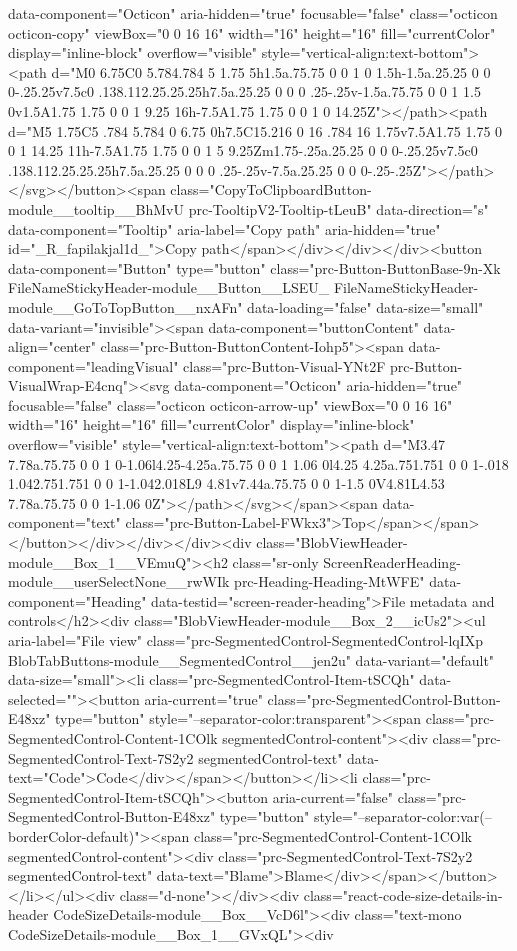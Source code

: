 {{{{{data-component="Octicon" aria-hidden="true" focusable="false" class="octicon octicon-copy" viewBox="0 0 16 16" width="16" height="16" fill="currentColor" display="inline-block" overflow="visible" style="vertical-align:text-bottom"><path d="M0 6.75C0 5.784.784 5 1.75 5h1.5a.75.75 0 0 1 0 1.5h-1.5a.25.25 0 0 0-.25.25v7.5c0 .138.112.25.25.25h7.5a.25.25 0 0 0 .25-.25v-1.5a.75.75 0 0 1 1.5 0v1.5A1.75 1.75 0 0 1 9.25 16h-7.5A1.75 1.75 0 0 1 0 14.25Z"></path><path d="M5 1.75C5 .784 5.784 0 6.75 0h7.5C15.216 0 16 .784 16 1.75v7.5A1.75 1.75 0 0 1 14.25 11h-7.5A1.75 1.75 0 0 1 5 9.25Zm1.75-.25a.25.25 0 0 0-.25.25v7.5c0 .138.112.25.25.25h7.5a.25.25 0 0 0 .25-.25v-7.5a.25.25 0 0 0-.25-.25Z"></path></svg></button><span class="CopyToClipboardButton-module__tooltip__BhMvU prc-TooltipV2-Tooltip-tLeuB" data-direction="s" data-component="Tooltip" aria-label="Copy path" aria-hidden="true" id="_R_fapilakjal1d_">Copy path</span></div></div></div><button data-component="Button" type="button" class="prc-Button-ButtonBase-9n-Xk FileNameStickyHeader-module__Button__LSEU_ FileNameStickyHeader-module__GoToTopButton__nxAFn" data-loading="false" data-size="small" data-variant="invisible"><span data-component="buttonContent" data-align="center" class="prc-Button-ButtonContent-Iohp5"><span data-component="leadingVisual" class="prc-Button-Visual-YNt2F prc-Button-VisualWrap-E4cnq"><svg data-component="Octicon" aria-hidden="true" focusable="false" class="octicon octicon-arrow-up" viewBox="0 0 16 16" width="16" height="16" fill="currentColor" display="inline-block" overflow="visible" style="vertical-align:text-bottom"><path d="M3.47 7.78a.75.75 0 0 1 0-1.06l4.25-4.25a.75.75 0 0 1 1.06 0l4.25 4.25a.751.751 0 0 1-.018 1.042.751.751 0 0 1-1.042.018L9 4.81v7.44a.75.75 0 0 1-1.5 0V4.81L4.53 7.78a.75.75 0 0 1-1.06 0Z"></path></svg></span><span data-component="text" class="prc-Button-Label-FWkx3">Top</span></span></button></div></div></div><div class="BlobViewHeader-module__Box_1__VEmuQ"><h2 class="sr-only ScreenReaderHeading-module__userSelectNone__rwWIk prc-Heading-Heading-MtWFE" data-component="Heading" data-testid="screen-reader-heading">File metadata and controls</h2><div class="BlobViewHeader-module__Box_2__icUs2"><ul aria-label="File view" class="prc-SegmentedControl-SegmentedControl-lqIXp BlobTabButtons-module__SegmentedControl__jen2u" data-variant="default" data-size="small"><li class="prc-SegmentedControl-Item-tSCQh" data-selected=""><button aria-current="true" class="prc-SegmentedControl-Button-E48xz" type="button" style="--separator-color:transparent"><span class="prc-SegmentedControl-Content-1COlk segmentedControl-content"><div class="prc-SegmentedControl-Text-7S2y2 segmentedControl-text" data-text="Code">Code</div></span></button></li><li class="prc-SegmentedControl-Item-tSCQh"><button aria-current="false" class="prc-SegmentedControl-Button-E48xz" type="button" style="--separator-color:var(--borderColor-default)"><span class="prc-SegmentedControl-Content-1COlk segmentedControl-content"><div class="prc-SegmentedControl-Text-7S2y2 segmentedControl-text" data-text="Blame">Blame</div></span></button></li></ul><div class="d-none"></div><div class="react-code-size-details-in-header CodeSizeDetails-module__Box__VcD6l"><div class="text-mono CodeSizeDetails-module__Box_1__GVxQL"><div }}}}}
